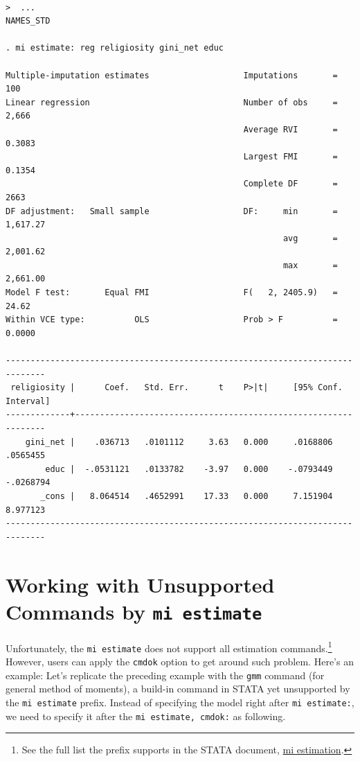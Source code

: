 \documentclass[11pt,]{article}
\theoremstyle{definition}
\theoremstyle{definition}
\theoremstyle{remark}
\begin{document}
\begin{verbatim}

>  ...
NAMES_STD

. mi estimate: reg religiosity gini_net educ

Multiple-imputation estimates                   Imputations       =        100
Linear regression                               Number of obs     =      2,666
                                                Average RVI       =     0.3083
                                                Largest FMI       =     0.1354
                                                Complete DF       =       2663
DF adjustment:   Small sample                   DF:     min       =   1,617.27
                                                        avg       =   2,001.62
                                                        max       =   2,661.00
Model F test:       Equal FMI                   F(   2, 2405.9)   =      24.62
Within VCE type:          OLS                   Prob > F          =     0.0000

------------------------------------------------------------------------------
 religiosity |      Coef.   Std. Err.      t    P>|t|     [95% Conf. Interval]
-------------+----------------------------------------------------------------
    gini_net |    .036713   .0101112     3.63   0.000     .0168806    .0565455
        educ |  -.0531121   .0133782    -3.97   0.000    -.0793449   -.0268794
       _cons |   8.064514   .4652991    17.33   0.000     7.151904    8.977123
------------------------------------------------------------------------------
\end{verbatim}

\section{\texorpdfstring{Working with Unsupported Commands by
\texttt{mi\ estimate}}{Working with Unsupported Commands by mi estimate}}\label{working-with-unsupported-commands-by-mi-estimate}

Unfortunately, the \texttt{mi\ estimate} does not support all estimation
commands.\footnote{See the full list the prefix supports in the STATA
  document,
  \href{http://www.stata.com/manuals14/miestimation.pdf\#miestimationDescriptionestimation_command}{mi
  estimation}.} However, users can apply the \texttt{cmdok} option to
get around such problem. Here's an example: Let's replicate the
preceding example with the \texttt{gmm} command (for general method of
moments), a build-in command in STATA yet unsupported by the
\texttt{mi\ estimate} prefix. Instead of specifying the model right
after \texttt{mi\ estimate:}, we need to specify it after the
\texttt{mi\ estimate,\ cmdok:} as following.
\end{document}
